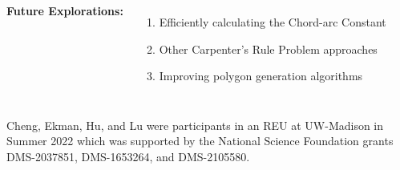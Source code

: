 \documentclass{beamer}
\begin{document}
\begin{frame}
\begin{columns}[t]
        \textbf{Future Explorations:}
        \begin{enumerate}
            \item Efficiently calculating the Chord-arc Constant
            \item Other Carpenter's Rule Problem approaches
            \item Improving polygon generation algorithms
        \end{enumerate}
        \vspace{0pt}
    \end{columns}
    
        {
            \renewcommand*{\bibfont}{\tiny}
            \printbibliography
            \vspace{-1.3cm}
            \tiny
            Cheng, Ekman, Hu, and Lu were participants in an REU at UW-Madison in Summer 2022 which was supported by the National Science Foundation grants DMS-2037851, DMS-1653264, and DMS-2105580.
        }
\end{frame}
\end{document}
